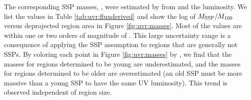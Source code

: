 The corresponding SSP masses, \massssp{}, were estimated by
 from \agessp{} and the \fuv{} luminosity. We list
the \massssp{} values in Table \ref{tab:uvr:fluxderived} and show the log of
$M_{\mathrm{SSP}} / M_{100}$ versus deprojected region area in Figure
\ref{fig:uvr:masses}. Most of the \massssp{} values are within one or two
orders of magnitude of \massoneh. This large uncertainty range is a consequence
of applying the SSP assumption to regions that are generally not SSPs. By
coloring each point in Figure \ref{fig:uvr:masses} by \agessp{}, we find
that the masses for regions determined to be young are underestimated, and the
masses for regions determined to be older are overestimated (an old SSP must be
more massive than a young SSP to have the same UV luminosity). This trend is
observed independent of region size.


